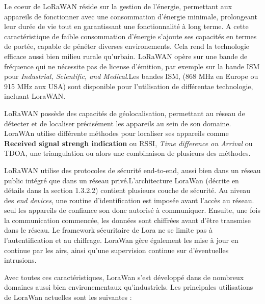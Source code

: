 \vspace{0.1cm}

Le coeur de LoRaWAN réside sur la gestion de l'énergie, permettant aux appareils de fonctionner avec une consommation d'énergie minimale, prolongeant leur durée de vie tout en garantissant une fonctionnalité à long terme. A cette caractéristique de faible consommation d'énergie s'ajoute ses capacités en termes de portée, capable de pénéter diverses environements. Cela rend la technologie efficace aussi bien milieu rurale qu'urbain. LoRaWAN opère sur une bande de fréquence qui ne nécessite pas de license d'émition, par exemple sur la bande ISM pour \textit{Industrial, Scientific, and Medical}.Les bandes ISM, (868 MHz en Europe ou 915 MHz aux USA) sont disponible pour l'utilisation de différentae technologie, incluant LoraWAN.

\vspace{0.1cm}

LoRaWAN possède des capacités de géolocalisation, permettant au réseau de détecter et de localiser précisément les appareils au sein de son domaine. LoraWAn utilise différente méthodes pour localiser ses appareils comme \textbf{Received signal strengh indication} ou RSSI, \textit{Time difference on Arrival} ou TDOA, une triangulation ou alors une combinaison de plusieurs des méthodes.

\vspace{0.1cm}

LoRaWAN utilise des protocoles de sécurité end-to-end, aussi bien dans un réseau public intégré que dans un réseau privé.L'architecture LoraWan (décrite en détails dans la section 1.3.2.2) contient plusieurs couche de sécurité. Au niveau des \textit{end devices}, une routine d'identification est imposée avant l'accès au réseau. seul les appareils de confiance son donc autorisé à communiquer. Ensuite, une fois la communication commencée, les données sont chiffrées avant d'être transmise dans le réseau. Le framework sécuritaire de Lora ne se limite pas à l'autentification et au chiffrage. LoraWan gère également les mise à jour en continue par les airs, ainsi qu'une supervision continue sur d'éventuelles intrusions.

\vspace{0.1cm}

Avec toutes ces caractéristiques, LoraWan s'est développé dans de nombreux domaines aussi bien environementaux qu'industriels. Les principales utilisations de LoraWan actuelles sont les suivantes :

